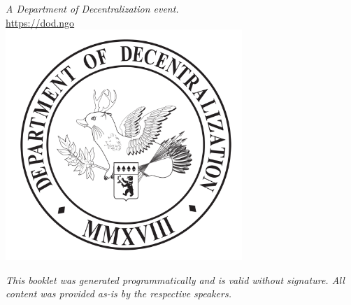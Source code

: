 \newpage
\thispagestyle{plain}
\mbox{}
\newpage
\begin{center}
  \thispagestyle{empty}
  \noindent
  \textit{\small A Department of Decentralization event.}\\
  \underline{\small https://dod.ngo}\\[3em]

  \includegraphics[width=0.67\textwidth]{wolpy.pdf}\\[1em]

  \vspace{\fill}

  \noindent\textit{\small This booklet was generated programmatically and is valid
  without signature. All content was provided as-is by the respective speakers.}
\end{center}
